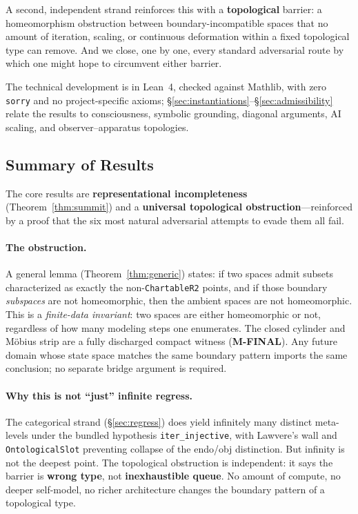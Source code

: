 \documentclass[11pt]{article}
\begin{document}
A second, independent strand reinforces this with a \textbf{topological}
barrier: a homeomorphism obstruction between boundary-incompatible
spaces that no amount of iteration, scaling, or continuous deformation
within a fixed topological type can remove.  And we close, one by one,
every standard adversarial route by which one might hope to circumvent
either barrier.

The technical development is in Lean~4, checked against Mathlib, with
zero \texttt{sorry} and no project-specific axioms;
\S\ref{sec:instantiations}--\S\ref{sec:admissibility} relate the
results to consciousness, symbolic grounding, diagonal arguments,
AI scaling, and observer--apparatus topologies.

\subsection{Summary of Results}

The core results are \textbf{representational incompleteness}
(Theorem~\ref{thm:summit}) and a \textbf{universal topological
obstruction}---reinforced by a proof that the six most natural
adversarial attempts to evade them all fail.

\paragraph{The obstruction.}
A general lemma (Theorem~\ref{thm:generic}) states: if two spaces admit
subsets characterized as exactly the non-\texttt{ChartableR2} points, and
if those boundary \emph{subspaces} are not homeomorphic, then the ambient
spaces are not homeomorphic.  This is a \emph{finite-data invariant}: two
spaces are either homeomorphic or not, regardless of how many modeling
steps one enumerates.  The closed cylinder and M\"obius strip are a fully
discharged compact witness (\textbf{M-FINAL}).  Any future domain whose
state space matches the same boundary pattern imports the same
conclusion; no separate bridge argument is required.

\paragraph{Why this is not ``just'' infinite regress.}
The categorical strand (\S\ref{sec:regress}) does yield infinitely many
distinct meta-levels under the bundled hypothesis
\texttt{iter\_injective}, with Lawvere's wall and
\texttt{OntologicalSlot} preventing collapse of the endo/obj distinction.
But infinity is not the deepest point.  The topological obstruction is
independent: it says the barrier is \textbf{wrong type}, not
\textbf{inexhaustible queue}.  No amount of compute, no deeper
self-model, no richer architecture changes the boundary pattern of a
topological type.
\end{document}
